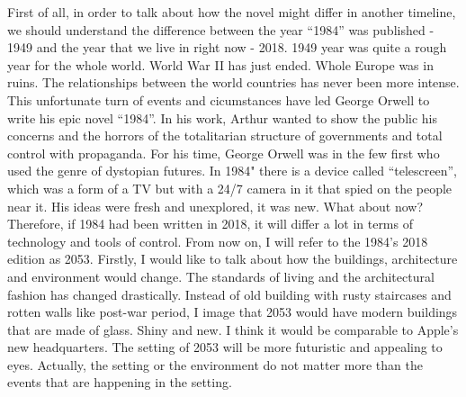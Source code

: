 \documentclass[a4paper,12pt]{article}
\begin{document}
First of all, in order to talk about how the novel might differ in another timeline, we should understand the difference between the year ``1984'' was published - 1949 and the year that we live in right now - 2018. 1949 year was quite a rough year for the whole world. World War II has just ended. Whole Europe was in ruins. The relationships between the world countries has never been more intense. This unfortunate turn of events and cicumstances have led George Orwell to write his epic novel ``1984''. In his work, Arthur wanted to show the public his concerns and the horrors of the totalitarian structure of governments and total control with propaganda. For his time, George Orwell was in the few first who used the genre of dystopian futures. In 1984" there is a device called ``telescreen'', which was a form of a TV but with a 24/7 camera in it that spied on the people near it. His ideas were fresh and unexplored, it was new. What about now?\\

Therefore, if 1984 had been written in 2018, it will differ a lot in terms of technology and tools of control. From now on, I will refer to the 1984's 2018 edition as 2053. Firstly, I would like to talk about how the buildings, architecture and environment would change. The standards of living and the architectural fashion has changed drastically. Instead of old building with rusty staircases and rotten walls like post-war period, I image that 2053 would have modern buildings that are made of glass. Shiny and new. I think it would be comparable to Apple's new headquarters.\cite{apple} The setting of 2053 will be more futuristic and appealing to eyes. Actually, the setting or the environment do not matter more than the events that are happening in the setting. \\
 
\end{document}
